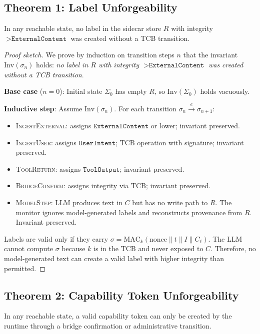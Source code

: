 \documentclass[sigconf,anonymous,review]{acmart}
\begin{document}
\subsection{Theorem 1: Label Unforgeability}

\begin{theorem}
In any reachable state, no label in the sidecar store $R$ with integrity $> \texttt{ExternalContent}$ was created without a TCB transition.
\end{theorem}

\begin{proof}[Proof sketch]
We prove by induction on transition steps $n$ that the invariant $\text{Inv}(\sigma_n)$ holds: \emph{no label in $R$ with integrity $> \texttt{ExternalContent}$ was created without a TCB transition}.

\textbf{Base case} ($n=0$): Initial state $\Sigma_0$ has empty $R$, so $\text{Inv}(\Sigma_0)$ holds vacuously.

\textbf{Inductive step}: Assume $\text{Inv}(\sigma_n)$. For each transition $\sigma_n \xrightarrow{e} \sigma_{n+1}$:
\begin{itemize}
  \item \textsc{IngestExternal}: assigns $\texttt{ExternalContent}$ or lower; invariant preserved.
  \item \textsc{IngestUser}: assigns $\texttt{UserIntent}$; TCB operation with signature; invariant preserved.
  \item \textsc{ToolReturn}: assigns $\texttt{ToolOutput}$; invariant preserved.
  \item \textsc{BridgeConfirm}: assigns integrity via TCB; invariant preserved.
  \item \textsc{ModelStep}: LLM produces text in $C$ but has no write path to $R$. The monitor ignores model-generated labels and reconstructs provenance from $R$. Invariant preserved.
\end{itemize}

Labels are valid only if they carry $\sigma = \text{MAC}_k(\text{nonce} \| t \| I \| C_\ell)$. The LLM cannot compute $\sigma$ because $k$ is in the TCB and never exposed to $C$. Therefore, no model-generated text can create a valid label with higher integrity than permitted.
\end{proof}

\subsection{Theorem 2: Capability Token Unforgeability}
\begin{theorem}
In any reachable state, a valid capability token can only be created by the runtime through a bridge confirmation or administrative transition.
\end{theorem}
\end{document}
